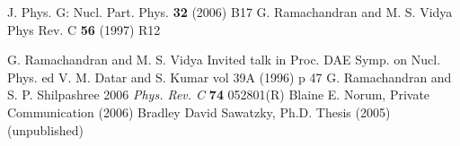\begin{thebibliography}{99}
J. Phys. G: Nucl. Part. Phys. {\bf 32} (2006) B17
  G. Ramachandran and M. S. Vidya Phys Rev. C {\bf 56} (1997) R12

G. Ramachandran and M. S. Vidya Invited talk in Proc. DAE Symp. on Nucl. Phys. ed V. M. Datar and S. Kumar vol 39A (1996) p 47
 G. Ramachandran and S. P. Shilpashree 2006 {\it Phys. Rev. C}  {\bf 74} 052801(R)
 Blaine E. Norum, Private Communication (2006)
 Bradley David Sawatzky, Ph.D. Thesis (2005) (unpublished)
\end{thebibliography}



